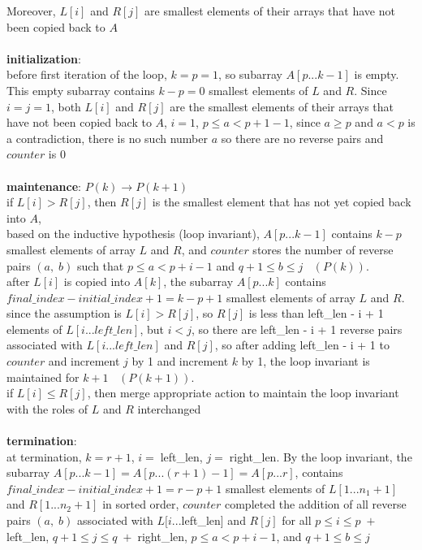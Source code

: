 \documentclass[12pt,border=4pt,multi]{article}%
\begin{document}
Moreover, $L[i]$ and $R[j]$ are smallest elements of their arrays that have not been copied back to $A$\\
\\
\textbf{initialization}:\\ 
before first iteration of the loop, $k = p = 1$, so subarray $A[p...k - 1]$ is empty. This empty subarray contains $k - p = 0$ smallest elements of $L$ and $R$. Since $i = j = 1$, both $L[i]$ and $R[j]$ are the smallest elements of their arrays that have not been copied back to $A$, $i = 1$, $p \leq a < p + 1 - 1$, since $a \geq p$ and $a < p$ is a contradiction, there is no such number $a$ so there are no reverse pairs and $counter$ is 0\\
\\
\textbf{maintenance}: $P(k) \rightarrow P(k + 1)$\\
if $L[i] > R[j]$, then $R[j]$ is the smallest element that has not yet copied back into $A$,\\
based on the inductive hypothesis (loop invariant), $A[p...k - 1]$ contains $k - p$ smallest elements of array $L$ and $R$, and $counter$ stores the number of reverse pairs $(a,\;b)$ such that $p \leq a < p + i - 1$ and $q + 1 \leq b \leq j$
$\;\;(P(k))$.\\
after $L[i]$ is copied into $A[k]$, the subarray $A[p...k]$ contains $final\_index - initial\_index + 1 = k - p + 1$ smallest elements of array $L$ and $R$. since the assumption is $L[i] > R[j]$, so $R[j]$ is less than left\_len - i + 1 elements of $L[i...left\_len]$, but $i < j$, so there are left\_len - i + 1 reverse pairs associated with $L[i...left\_len]$ and $R[j]$, so after adding left\_len - i + 1 to $counter$ and increment $j$ by 1 and increment $k$ by 1, the loop invariant is maintained for $k + 1$ $\;\;(P(k + 1))$.\\
if $L[i] \leq R[j]$, then merge appropriate action to maintain the loop invariant with the roles of $L$ and $R$ interchanged\\
\\
\textbf{termination}:\\
at termination, $k = r + 1$, $i = \;$left\_len, $j = \;$right\_len. By the loop invariant, the subarray $A[p...k - 1] = A[p...(r + 1) - 1] = A[p...r]$, contains $final\_index - initial\_index + 1 = r - p + 1$ smallest elements of $L[1...n_1 + 1]$ and $R[1...n_2 + 1]$ in sorted order, $counter$ completed the addition of all reverse pairs $(a,\;b)$ associated with $L[i...$left\_len] and $R[j]$ for all $p \leq i \leq p \; + \;$left\_len, $q + 1 \leq j \leq q\; + \; $right\_len, $p \leq a < p + i - 1$, and $q + 1 \leq b \leq j$\\
\end{document}
